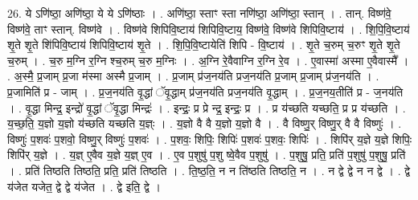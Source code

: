\documentclass[17pt]{extarticle}
\begin{document}
26. ये ऽणि॑ष्ठा॒ अणि॑ष्ठा॒ ये ये ऽणि॑ष्ठाः । . अणि॑ष्ठा॒ स्ताꣳ स्ता नणि॑ष्ठा॒ अणि॑ष्ठा॒ स्तान् । . तान्. विष्ण॑वे॒ विष्ण॑वे॒ ताꣳ स्तान्. विष्ण॑वे । . विष्ण॑वे शिपिवि॒ष्टाय॑ शिपिवि॒ष्टाय॒ विष्ण॑वे॒ विष्ण॑वे शिपिवि॒ष्टाय॑ । . शि॒पि॒वि॒ष्टाय॑ शृ॒ते शृ॒ते शि॑पिवि॒ष्टाय॑ शिपिवि॒ष्टाय॑ शृ॒ते । . शि॒पि॒वि॒ष्टायेति॑ शिपि - वि॒ष्टाय॑ । . शृ॒ते च॒रुम् च॒रुꣳ शृ॒ते शृ॒ते च॒रुम् । . च॒रु म॒ग्नि र॒ग्नि श्च॒रुम् च॒रु म॒ग्निः । . अ॒ग्नि रे॒वैवाग्नि र॒ग्नि रे॒व । . ए॒वास्मा॑ अस्मा ए॒वैवास्मै᳚ । . अ॒स्मै॒ प्र॒जाम् प्र॒जा म॑स्मा अस्मै प्र॒जाम् । . प्र॒जाम् प्र॑ज॒नय॑ति प्रज॒नय॑ति प्र॒जाम् प्र॒जाम् प्र॑ज॒नय॑ति । . प्र॒जामिति॑ प्र - जाम् । . प्र॒ज॒नय॑ति वृ॒द्धां ॅवृ॒द्धाम् प्र॑ज॒नय॑ति प्रज॒नय॑ति वृ॒द्धाम् । . प्र॒ज॒नय॒तीति॑ प्र - ज॒नय॑ति । . वृ॒द्धा मिन्द्र॒ इन्द्रो॑ वृ॒द्धां ॅवृ॒द्धा मिन्द्रः॑ । . इन्द्रः॒ प्र प्रे न्द्र॒ इन्द्रः॒ प्र । . प्र य॑च्छति यच्छति॒ प्र प्र य॑च्छति । . य॒च्छ॒ति॒ य॒ज्ञो य॒ज्ञो य॑च्छति यच्छति य॒ज्ञ्ः । . य॒ज्ञो वै वै य॒ज्ञो य॒ज्ञो वै । . वै विष्णु॒र् विष्णु॒र् वै वै विष्णुः॑ । . विष्णुः॑ प॒शवः॑ प॒शवो॒ विष्णु॒र् विष्णुः॑ प॒शवः॑ । . प॒शवः॒ शिपिः॒ शिपिः॑ प॒शवः॑ प॒शवः॒ शिपिः॑ । . शिपि॑र् य॒ज्ञे य॒ज्ञे शिपिः॒ शिपि॑र् य॒ज्ञे । . य॒ज्ञ् ए॒वैव य॒ज्ञे य॒ज्ञ् ए॒व । . ए॒व प॒शुषु॑ प॒शु ष्वे॒वैव प॒शुषु॑ । . प॒शुषु॒ प्रति॒ प्रति॑ प॒शुषु॑ प॒शुषु॒ प्रति॑ । . प्रति॑ तिष्ठति तिष्ठति॒ प्रति॒ प्रति॑ तिष्ठति । . ति॒ष्ठ॒ति॒ न न ति॑ष्ठति तिष्ठति॒ न । . न द्वे द्वे न न द्वे । . द्वे य॑जेत यजेत॒ द्वे द्वे य॑जेत । . द्वे इति॒ द्वे । \newline
\end{document}

